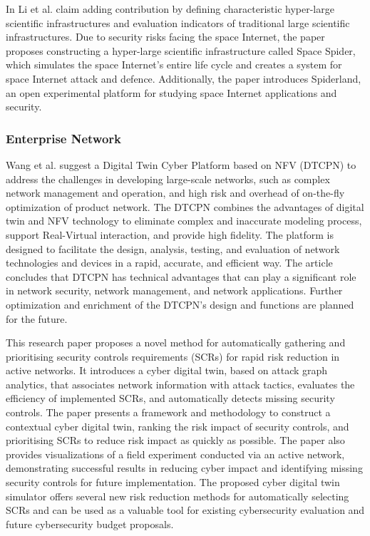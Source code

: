 In \cite{jiaqiliSpaceSpiderHyper2022} Li et al. claim adding contribution by defining characteristic hyper-large scientific infrastructures and evaluation indicators of traditional large scientific infrastructures. Due to security risks facing the space Internet, the paper proposes constructing a hyper-large scientific infrastructure called Space Spider, which simulates the space Internet's entire life cycle and creates a system for space Internet attack and defence. Additionally, the paper introduces Spiderland, an open experimental platform for studying space Internet applications and security.

\subsubsection{Enterprise Network}
 Wang et al.\cite{wangDTCPNDigitalTwin2022} suggest a Digital Twin Cyber Platform based on NFV (DTCPN) to address the challenges in developing large-scale networks, such as complex network management and operation, and high risk and overhead of on-the-fly optimization of product network. The DTCPN combines the advantages of digital twin and NFV technology to eliminate complex and inaccurate modeling process, support Real-Virtual interaction, and provide high fidelity. The platform is designed to facilitate the design, analysis, testing, and evaluation of network technologies and devices in a rapid, accurate, and efficient way. The article concludes that DTCPN has technical advantages that can play a significant role in network security, network management, and network applications. Further optimization and enrichment of the DTCPN's design and functions are planned for the future.

This\cite{hadarCyberDigitalTwin2020} research paper proposes a novel method for automatically gathering and prioritising security controls requirements (SCRs) for rapid risk reduction in active networks. It introduces a cyber digital twin, based on attack graph analytics, that associates network information with attack tactics, evaluates the efficiency of implemented SCRs, and automatically detects missing security controls. The paper presents a framework and methodology to construct a contextual cyber digital twin, ranking the risk impact of security controls, and prioritising SCRs to reduce risk impact as quickly as possible. The paper also provides visualizations of a field experiment conducted via an active network, demonstrating successful results in reducing cyber impact and identifying missing security controls for future implementation. The proposed cyber digital twin simulator offers several new risk reduction methods for automatically selecting SCRs and can be used as a valuable tool for existing cybersecurity evaluation and future cybersecurity budget proposals.

